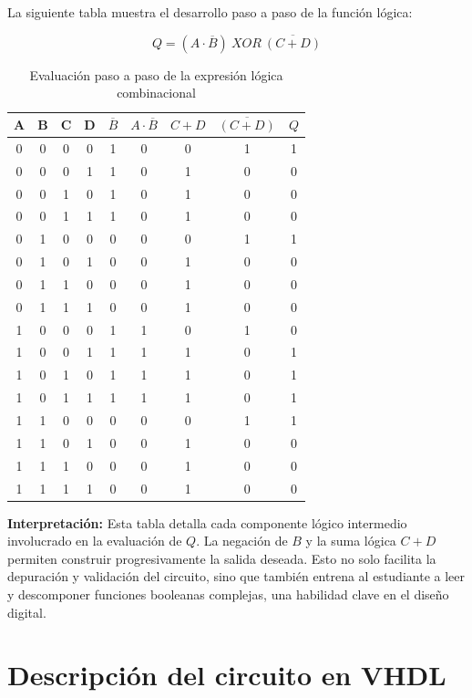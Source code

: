 \documentclass[a4paper,12pt]{article}
\begin{document}
La siguiente tabla muestra el desarrollo paso a paso de la función lógica:

\[
Q = (A \cdot \overline{B}) \ XOR \ \overline{(C + D)}
\]

\begin{table}[H]
\centering
\renewcommand{\arraystretch}{1.2}
\begin{tabular}{cccc|c|c|c|c|c}
\toprule
A & B & C & D & $\overline{B}$ & $A \cdot \overline{B}$ & $C + D$ & $\overline{(C + D)}$ & $Q$ \\
\midrule
0 & 0 & 0 & 0 & 1 & 0 & 0 & 1 & 1 \\
0 & 0 & 0 & 1 & 1 & 0 & 1 & 0 & 0 \\
0 & 0 & 1 & 0 & 1 & 0 & 1 & 0 & 0 \\
0 & 0 & 1 & 1 & 1 & 0 & 1 & 0 & 0 \\
0 & 1 & 0 & 0 & 0 & 0 & 0 & 1 & 1 \\
0 & 1 & 0 & 1 & 0 & 0 & 1 & 0 & 0 \\
0 & 1 & 1 & 0 & 0 & 0 & 1 & 0 & 0 \\
0 & 1 & 1 & 1 & 0 & 0 & 1 & 0 & 0 \\
1 & 0 & 0 & 0 & 1 & 1 & 0 & 1 & 0 \\
1 & 0 & 0 & 1 & 1 & 1 & 1 & 0 & 1 \\
1 & 0 & 1 & 0 & 1 & 1 & 1 & 0 & 1 \\
1 & 0 & 1 & 1 & 1 & 1 & 1 & 0 & 1 \\
1 & 1 & 0 & 0 & 0 & 0 & 0 & 1 & 1 \\
1 & 1 & 0 & 1 & 0 & 0 & 1 & 0 & 0 \\
1 & 1 & 1 & 0 & 0 & 0 & 1 & 0 & 0 \\
1 & 1 & 1 & 1 & 0 & 0 & 1 & 0 & 0 \\
\bottomrule
\end{tabular}
\caption{Evaluación paso a paso de la expresión lógica combinacional}
\end{table}

\noindent
\textbf{Interpretación:} Esta tabla detalla cada componente lógico intermedio involucrado en la evaluación de \( Q \). La negación de \( B \) y la suma lógica \( C + D \) permiten construir progresivamente la salida deseada. Esto no solo facilita la depuración y validación del circuito, sino que también entrena al estudiante a leer y descomponer funciones booleanas complejas, una habilidad clave en el diseño digital.


\newpage

\section{Descripción del circuito en VHDL}
\end{document}

